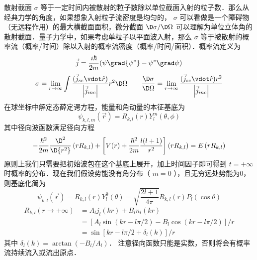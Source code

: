 
散射截面 $\sigma$ 等于一定时间内被散射的粒子数除以单位截面入射的粒子数．那么从经典力学的角度，如果想象入射粒子流密度是均匀的， $\sigma$ 可以看做是一个障碍物（无远程作用）的最大横截面面积，微分截面 $\D \sigma/\D\Omega$ 可以理解为单位立体角的散射截面．量子力学中，如果考虑单粒子以平面波入射，那么 $\sigma$ 等于被散射的概率流（概率/时间）除以入射的概率流密度（概率/时间/面积）．概率流定义为
\begin{equation}
\vec j = \frac{{i\hbar }}{{2m}}(\psi \grad {\psi ^ * } - {\psi ^ * }\grad \psi )
\end{equation}
\begin{equation}\label{ParWav_eq3}
\sigma  = \mathop {\lim }\limits_{r \to \infty } \int {\frac{{{\text{(}}{{\vec j}_{sc}} \vdot \hat r{\text{)}}}}{{\left| {{{\vec j}_{inc}}} \right|}}{r^2}\D \Omega } 
\qquad
\frac{{\D \sigma }}{{\D \Omega }} = \mathop {\lim }\limits_{r \to \infty } \frac{{{\text{(}}{{\vec j}_{sc}} \vdot \hat r{\text{)}}{r^2}}}{{\left| {{{\vec j}_{inc}}} \right|}}
\end{equation}
在球坐标中解定态薛定谔方程，能量和角动量的本征基底为
\begin{equation}
{\psi _{k,l,m}}(\vec r) = {R_{k,l}}(r)Y_l^m(\theta ,\phi )
\end{equation}
其中径向波函数满足径向方程
\begin{equation}\label{ParWav_eq4}
- \frac{{{\hbar ^2}}}{{2m}}\frac{{{\D ^2}}}{{\D {r^2}}}\left( {r{R_{k,l}}} \right) + \left[ {V(r) + \frac{{{\hbar ^2}}}{{2m}}\frac{{l(l + 1)}}{{{r^2}}}} \right]\left( {r{R_{k,l}}} \right) = E\left( {r{R_{k,l}}} \right)
\end{equation}
原则上我们只需要把初始波包在这个基底上展开，加上时间因子即可得到 $t =  + \infty$ 时概率的分布．现在我们假设势能没有角分布（ $m = 0$ ），且无穷远处势能为0，则基底化简为
\begin{equation}
{\psi _{k,l}}(\vec r) = {R_{k,l}}(r)Y_l^0(\theta ) = \sqrt {\frac{{2l + 1}}{{4\pi }}} {R_{k,l}}(r){P_l}(\cos \theta )
\end{equation}
\begin{equation}\begin{aligned}\label{ParWav_eq6}
{R_{k,l}}(r \to  + \infty ) &= {A_l}{j_l}(kr) + {B_l}{n_l}(kr) \\
&= [{A_l}\sin (kr - l\pi /2) - {B_l}\cos(kr - l\pi /2)]/r \\
&= \sin [kr - l\pi /2 + {\delta _l}(k)]/r
\end{aligned}\end{equation}
其中 ${\delta _l}(k) = \arctan ( { - {B_l}/{A_l}} )$． 注意径向函数只能是实数，否则将会有概率流持续流入或流出原点．

